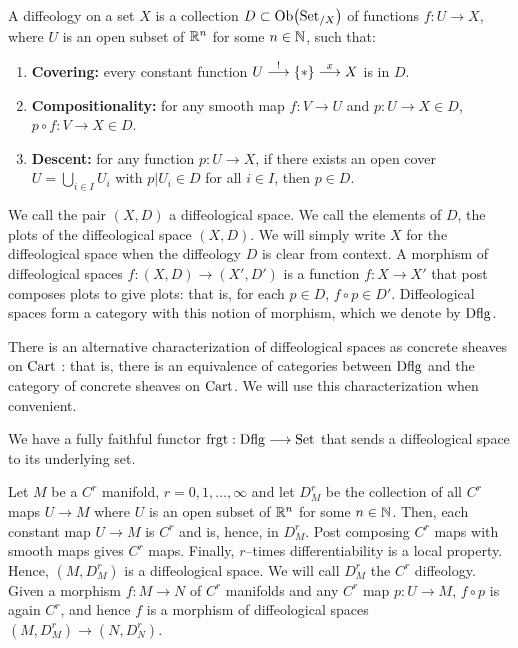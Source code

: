 \documentclass[11pt]{amsart}
\begin{document}
\begin{defn}\label{defn:dflg}
A diffeology on a set $X$ is a collection $D \subset \Ob{\Set_{/X}}$ of functions $f : U \to X$,
where $U$ is an open subset of $\mathbb{R}^n$ for some $n \in \mathbb{N}$, such that:
\begin{enumerate}
\item \textbf{Covering:} every constant function $U \to[!] \set{*} \to[x] X$ is in $D$.
\item \textbf{Compositionality:} for any smooth map $f : V \to U$ and
$p : U \to X \in D$, $p \circ f : V \to X \in D$.
\item \textbf{Descent:} for any function $p : U \to X$, if there exists an open cover
$U = \bigcup_{i \in I} U_i$ with $p|U_i \in D$ for all $i \in I$, then $p \in D$.
\end{enumerate}
We call the pair $(X, D)$ a diffeological space. We call the elements of $D$, the plots of the
diffeological space $(X, D)$. We will simply write $X$ for the diffeological space when the
diffeology $D$ is clear from context.
A morphism of diffeological spaces $f : (X, D) \to (X', D')$ is a function $f : X \to X'$ that
post composes plots to give plots: that is, for each $p \in D$,
$f \circ p \in D'$.
Diffeological spaces form a category with this notion of morphism, which we denote by $\mathrm{Dflg}$.
\end{defn}

\begin{rmk}
There is an alternative characterization of diffeological spaces as concrete sheaves
on $\mathrm{Cart}$ \cite{BH11}: that is, there is an equivalence of categories
between $\mathrm{Dflg}$ and the category of concrete sheaves on $\mathrm{Cart}$. We will use this characterization
when convenient.
\end{rmk}

\begin{cor}
We have a fully faithful functor $\frgt : \Dflg \to \Set$ that sends a diffeological space
to its underlying set.
\end{cor}

\begin{exm}[$C^r$ Manifolds]
Let $M$ be a $C^r$ manifold, $r = 0, 1, \dots, \infty$ and let $D^r_M$ be the collection of all
$C^r$ maps $U \to M$ where $U$ is an open subset of $\mathbb{R}^n$ for some $n \in \mathbb{N}$.
Then, each constant map $U \to M$ is $C^r$ and is, hence, in $D^r_M$.
Post composing $C^r$ maps with smooth maps gives $C^r$ maps.
Finally, $r$--times differentiability is a local property.
Hence, $(M, D^r_M)$ is a diffeological space.
We will call $D^r_M$ the $C^r$ diffeology.
Given a morphism $f : M \to N$ of $C^r$ manifolds and any $C^r$ map $p : U \to M$, $f \circ p$
is again $C^r$, and hence $f$ is a morphism of diffeological spaces $(M, D^r_M) \to (N, D^r_N)$.
\end{exm}
\end{document}
